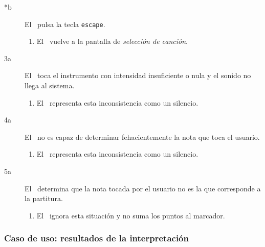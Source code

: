 \begin{description}
\begin{description}
  \item[*b] El \jugador\ pulsa la tecla \texttt{escape}.
    \begin{enumerate}
    \item El \sistema\ vuelve a la pantalla de \textit{selección de canción}.
    \end{enumerate}

  \item [3a] El \jugador\ toca el instrumento con intensidad insuficiente o nula
    y el sonido no llega al sistema.
    \begin{enumerate}
    \item El \sistema\ representa esta inconsistencia como un silencio.
    \end{enumerate}

  \item [4a] El \sistema\ no es capaz de determinar fehacientemente la nota que
    toca el usuario.
    \begin{enumerate}
    \item El \sistema\ representa esta inconsistencia como un silencio.
    \end{enumerate}

  \item[5a] El \sistema\ determina que la nota tocada por el usuario no es la
    que corresponde a la partitura.
    \begin{enumerate}
    \item El \sistema\ ignora esta situación y no suma los puntos al marcador.
    \end{enumerate}

  \end{description}  
\end{description}

\subsubsection{Caso de uso: resultados de la interpretación}

